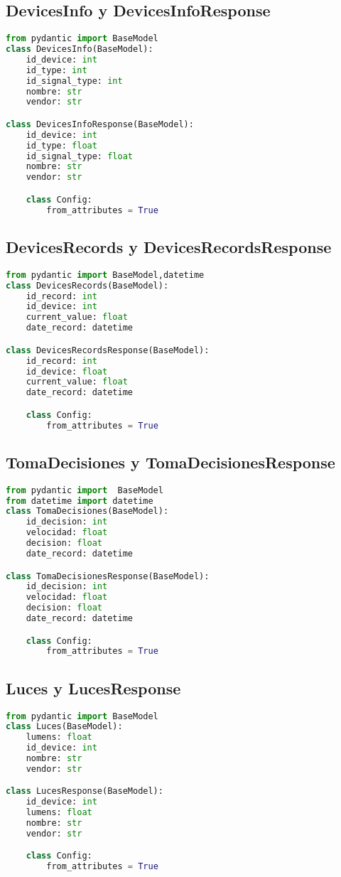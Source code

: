 \documentclass[12pt,letterpaper]{report}
\begin{document}
\subsection{DevicesInfo y DevicesInfoResponse}
\begin{lstlisting}[language=python]
    from pydantic import BaseModel
class DevicesInfo(BaseModel):
    id_device: int
    id_type: int
    id_signal_type: int
    nombre: str
    vendor: str

class DevicesInfoResponse(BaseModel):
    id_device: int
    id_type: float
    id_signal_type: float
    nombre: str
    vendor: str

    class Config:
        from_attributes = True
\end{lstlisting}

\subsection{DevicesRecords y DevicesRecordsResponse}
\begin{lstlisting}[language=python]
    from pydantic import BaseModel,datetime
class DevicesRecords(BaseModel):
    id_record: int
    id_device: int
    current_value: float
    date_record: datetime

class DevicesRecordsResponse(BaseModel):
    id_record: int
    id_device: float
    current_value: float
    date_record: datetime

    class Config:
        from_attributes = True
\end{lstlisting}

\subsection{TomaDecisiones y TomaDecisionesResponse}
\begin{lstlisting}[language=python]
    from pydantic import  BaseModel
from datetime import datetime
class TomaDecisiones(BaseModel):
    id_decision: int
    velocidad: float
    decision: float
    date_record: datetime

class TomaDecisionesResponse(BaseModel):
    id_decision: int
    velocidad: float
    decision: float
    date_record: datetime

    class Config:
        from_attributes = True
\end{lstlisting}

\subsection{Luces y LucesResponse}
\begin{lstlisting}[language=python]
    from pydantic import BaseModel
class Luces(BaseModel):
    lumens: float
    id_device: int
    nombre: str
    vendor: str

class LucesResponse(BaseModel):
    id_device: int
    lumens: float
    nombre: str
    vendor: str

    class Config:
        from_attributes = True
\end{lstlisting}
\end{document}
